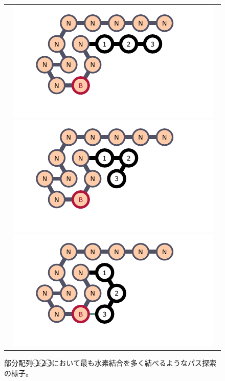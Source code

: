 \documentclass[a4,11pt]{article}
\begin{document}
%
%
\begin{figure}[h]
\centering
\begin{tabular}{c}

\begin{minipage}{0.33\hsize}
\centering
	\includegraphics[width=\textwidth]{fig/svg/confex1_0.pdf}
\end{minipage}

\begin{minipage}{0.33\hsize}
\centering
	\includegraphics[width=\textwidth]{fig/svg/confex1_1.pdf}
\end{minipage}

\begin{minipage}{0.33\hsize}
\centering
	\includegraphics[width=\textwidth]{fig/svg/confex1_2.pdf}
\end{minipage}

\end{tabular}
\caption{部分配列{-}\textcircled{\scriptsize 1}{-}\textcircled{\scriptsize 2}{-}\textcircled{\scriptsize 3}において最も水素結合を多く結べるようなパス探索の様子。}
\label{fig:glider1_01}
\end{figure}
\end{document}
